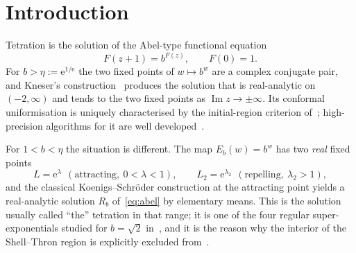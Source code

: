 \documentclass[11pt,a4paper]{article}
\theoremstyle{definition}
\newcommand{\Rr}{R}
\newcommand{\eee}{\mathrm{e}}
\begin{document}
\begin{abstract}
sewing solution with explicit constants.  That solution is characterised uniquely by its two regular
representations and the height of its seam.  The base-continued family has it
as boundary value whenever its $\theta$-representations stay uniformly
bounded along the ladder.
The sewn family varies holomorphically near every real $b\in(1,\eta)$;
near $\eta$ its imaginary part at real heights has an explicit leading
$\Lambda$-profile and is not identically zero on any interval about $0$.
Computing $T_b$ directly up to $\eta-b=3\cdot10^{-5}$ confirms the limits for
$n=1,2,3$ with deficits $\propto|\log\lambda|^2$.
Numerical consistency checks of the separation coefficients are reported
separately from exact identities; their quoted decimal comparisons
have no certified error bounds.
An interval-certified quasiconformal argument extends the exterior
Kneser family across a non-cusp Shell--Thron boundary subarc on a common
complex neighbourhood of the full height segment $[0,1]$.
Identification with the inner sewn family remains open.
\end{abstract}

\section{Introduction}

Tetration is the solution of the Abel-type functional equation
\begin{equation}\label{eq:abel}
  F(z+1)=b^{F(z)},\qquad F(0)=1 .
\end{equation}
For $b>\eta:=\eee^{1/\eee}$ the two fixed points of $w\mapsto b^{w}$ are a
complex conjugate pair, and Kneser's construction~\cite{Kneser1950} produces
the solution that is real-analytic on $(-2,\infty)$ and tends to the two fixed
points as $\operatorname{Im}z\to\pm\infty$.  Its conformal uniformisation
is uniquely characterised by the initial-region criterion
of~\cite{TrappmannKouznetsov2011}; high-precision algorithms for it are
well developed~\cite{Kouznetsov2009,KouznetsovTrappmann2010}.

For $1<b<\eta$ the situation is different.  The map $E_b(w)=b^{w}$ has two
\emph{real} fixed points
\begin{equation}\label{eq:fps}
  L=\eee^{\lambda}\ \ (\text{attracting},\ 0<\lambda<1),
  \qquad
  L_2=\eee^{\lambda_2}\ \ (\text{repelling},\ \lambda_2>1),
\end{equation}
and the classical Koenigs--Schr\"oder construction at the attracting point
yields a real-analytic solution $\Rr_b$ of~\eqref{eq:abel} by elementary means.
This is the solution usually called ``the'' tetration in that range; it is one
of the four regular super-exponentials studied for $b=\sqrt2$
in~\cite{KouznetsovTrappmann2010}, and it is the reason why the interior of the
Shell--Thron region is explicitly excluded from~\cite{PaulsenCowgill2017}.
\end{document}
